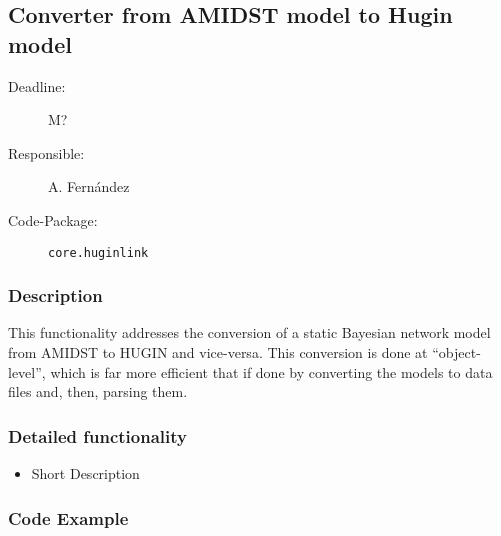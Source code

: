\newpage
\subsection{Converter from AMIDST model to Hugin model}
\label{ConverterToAMIDST}

\begin{description}
\item[Deadline:] M?
\item[Responsible:] A. Fern\'andez
\item[Code-Package:] \texttt{core.huginlink}
\end{description}

\subsubsection*{Description}

This functionality addresses the conversion of a static Bayesian network model from AMIDST to HUGIN and vice-versa. This conversion is done at ``object-level'', which is far more efficient that if done by converting the models to data files and, then, parsing them. 

\subsubsection*{Detailed functionality}

\begin{itemize}
\item Short Description
\end{itemize}


\subsubsection*{Code Example}
